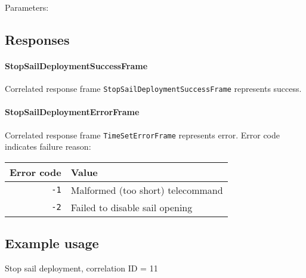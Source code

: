 Parameters: 

\begin{tcarglist}
\end{tcarglist}


\subsection{Responses}

\paragraph{StopSailDeploymentSuccessFrame}
Correlated response frame \texttt{StopSailDeploymentSuccessFrame} represents success.

\paragraph{StopSailDeploymentErrorFrame}
Correlated response frame \texttt{TimeSetErrorFrame} represents error. Error code indicates failure reason:

\begin{tabular}{r | l}
	Error code & Value \\
	\hline
	\texttt{-1} & Malformed (too short) telecommand \\	
	\texttt{-2} & Failed to disable sail opening \\	
\end{tabular}

\subsection{Example usage}
Stop sail deployment, correlation ID = 11

